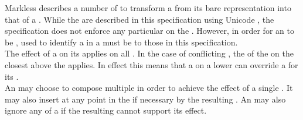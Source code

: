 Markless describes a number of  to transform a  from its bare  representation into that of a . While the  are described in this specification using Unicode , the specification does not enforce any particular  on the . However, in order for an  to be ,  used to identify a  in a  must be  to those in this specification. \\

The effect of a  on its  applies on all . In the case of conflicting , the  of the  on the closest  above the  applies. In effect this means that a  on a lower  can override a  for its .  \\

An  may choose to compose multiple  in order to achieve the effect of a single . It may also insert  at any point in the  if necessary by the resulting . An  may also ignore any  of a  if the resulting cannot support its effect.



